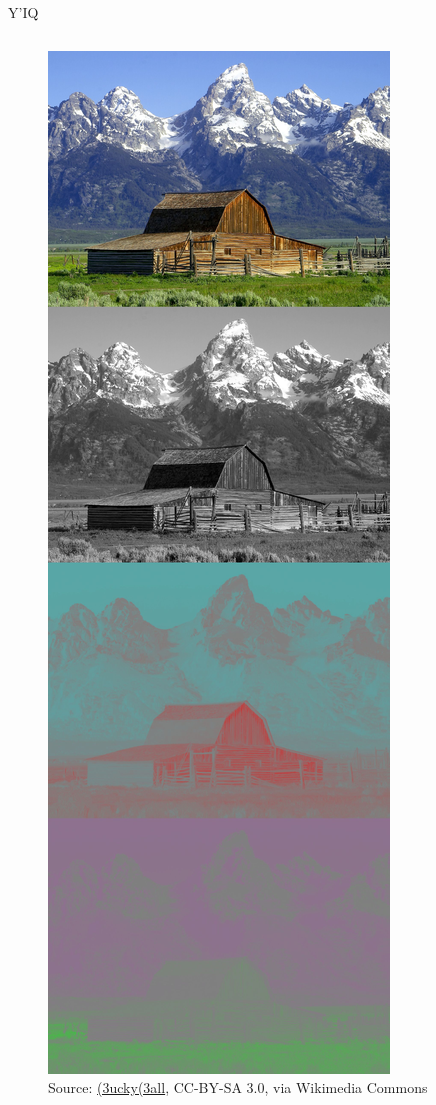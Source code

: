 \documentclass[aspectratio=169,usepdftitle=false]{fireshonks}
\begin{document}
\begin{frame}{Y'IQ}
\begin{columns}
\begin{column}
\begin{figure}
                \includegraphics[height=10\baselineskip,keepaspectratio]{figures/YIQ_components.jpg}
                \caption*{Source: \href{https://commons.wikimedia.org/wiki/File:YIQ_components.jpg}{(3ucky(3all}, CC-BY-SA 3.0, via Wikimedia Commons}
            \end{figure}
        \end{column}
    \end{columns}
\end{frame}
\end{document}
